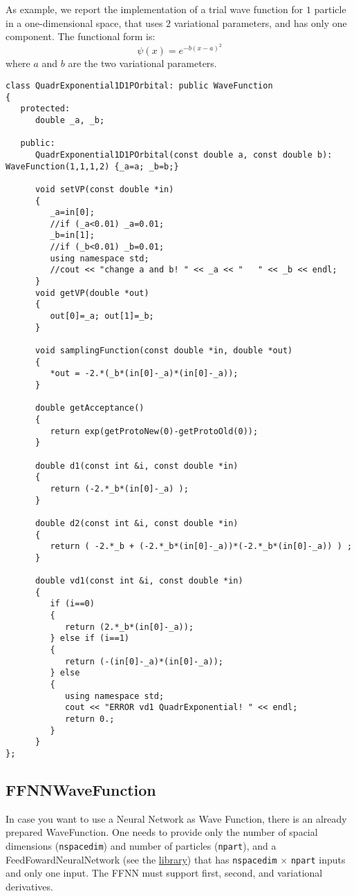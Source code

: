 \documentclass[11pt,a4paper,twoside]{article}
\begin{document}
As example, we report the implementation of a trial wave function for $1$ particle in a one-dimensional space, that uses $2$ variational parameters, and has only one component.
The functional form is:
\begin{equation}
   \psi(x) = e^{- b(x-a)^2}
\end{equation}
where $a$ and $b$ are the two variational parameters.

\begin{lstlisting}
class QuadrExponential1D1POrbital: public WaveFunction
{
   protected:
      double _a, _b;

   public:
      QuadrExponential1D1POrbital(const double a, const double b): WaveFunction(1,1,1,2) {_a=a; _b=b;}

      void setVP(const double *in)
      {
         _a=in[0];
         //if (_a<0.01) _a=0.01;
         _b=in[1];
         //if (_b<0.01) _b=0.01;
         using namespace std;
         //cout << "change a and b! " << _a << "   " << _b << endl;
      }
      void getVP(double *out)
      {
         out[0]=_a; out[1]=_b;
      }

      void samplingFunction(const double *in, double *out)
      {
         *out = -2.*(_b*(in[0]-_a)*(in[0]-_a));
      }

      double getAcceptance()
      {
         return exp(getProtoNew(0)-getProtoOld(0));
      }

      double d1(const int &i, const double *in)
      {
         return (-2.*_b*(in[0]-_a) );
      }

      double d2(const int &i, const double *in)
      {
         return ( -2.*_b + (-2.*_b*(in[0]-_a))*(-2.*_b*(in[0]-_a)) ) ;
      }

      double vd1(const int &i, const double *in)
      {
         if (i==0)
         {
            return (2.*_b*(in[0]-_a));
         } else if (i==1)
         {
            return (-(in[0]-_a)*(in[0]-_a));
         } else
         {
            using namespace std;
            cout << "ERROR vd1 QuadrExponential! " << endl;
            return 0.;
         }
      }
};
\end{lstlisting}




\subsection{FFNNWaveFunction} %
\label{sub:ffnnwavefunction}

In case you want to use a Neural Network as Wave Function, there is an already prepared WaveFunction.
One needs to provide only the number of spacial dimensions (\verb+nspacedim+) and number of particles (\verb+npart+), and a FeedFowardNeuralNetwork (see the \href{https://github.com/francesco086/FeedForwardNeuralNetwork}{library}) that has \verb+nspacedim+ $\times$ \verb+npart+ inputs and only one input.
The FFNN must support first, second, and variational derivatives.
\end{document}
